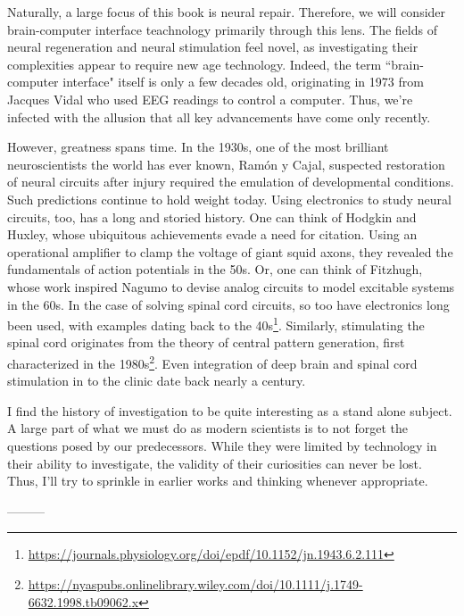 Naturally, a large focus of this book is neural repair. Therefore, we will consider brain-computer interface teachnology primarily through this lens. The fields of neural regeneration and neural stimulation feel novel, as investigating their complexities appear to require new age technology. Indeed, the term ``brain-computer interface" itself is only a few decades old, originating in 1973 from Jacques Vidal who used EEG readings to control a computer. Thus, we're infected with the allusion that all key advancements have come only recently.\newline

However, greatness spans time. In the 1930s, one of the most brilliant neuroscientists the world has ever known, Ramón y Cajal, suspected restoration of neural circuits after injury required the emulation of developmental conditions. Such predictions continue to hold weight today. Using electronics to study neural circuits, too, has a long and storied history. One can think of Hodgkin and Huxley, whose ubiquitous achievements evade a need for citation. Using an operational amplifier to clamp the voltage of giant squid axons, they revealed the fundamentals of action potentials in the 50s. Or, one can think of Fitzhugh, whose work inspired Nagumo to devise analog circuits to model excitable systems in the 60s. In the case of solving spinal cord circuits, so too have electronics long been used, with examples dating back to the 40s\footnote{\url{https://journals.physiology.org/doi/epdf/10.1152/jn.1943.6.2.111}}. Similarly, stimulating the spinal cord originates from the theory of central pattern generation, first characterized in the 1980s\footnote{\url{https://nyaspubs.onlinelibrary.wiley.com/doi/10.1111/j.1749-6632.1998.tb09062.x}}. Even integration of deep brain and spinal cord stimulation in to the clinic date back nearly a century.\newline

I find the history of investigation to be quite interesting as a stand alone subject. A large part of what we must do as modern scientists is to not forget the questions posed by our predecessors. While they were limited by technology in their ability to investigate, the validity of their curiosities can never be lost. Thus, I'll try to sprinkle in earlier works and thinking whenever appropriate.\newline


---------

